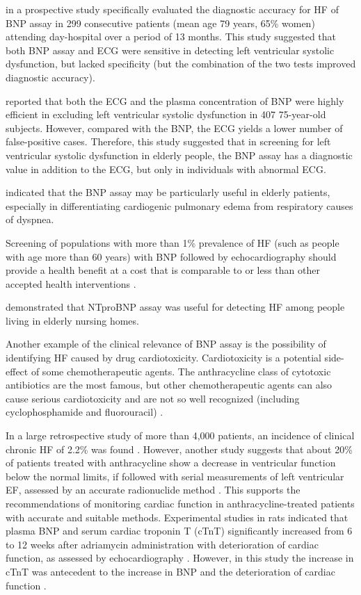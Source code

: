 \documentclass[14pt,a4paper,onecolumn]{extarticle}
\begin{document}
\citep{bib3143} in a prospective study specifically evaluated the diagnostic accuracy for HF of BNP assay in 299 consecutive patients (mean age 79 years, 65\% women) attending day-hospital over a period of 13 months. This study suggested that both BNP assay and ECG were sensitive in detecting left ventricular systolic dysfunction, but lacked specificity (but the combination of the two tests improved diagnostic accuracy).

\citep{bib3172} reported that both the ECG and the plasma concentration of BNP were highly efficient in excluding left ventricular systolic dysfunction in 407 75-year-old subjects. However, compared with the BNP, the ECG yields a lower number of false-positive cases. Therefore, this study suggested that in screening for left ventricular systolic dysfunction in elderly people, the BNP assay has a diagnostic value in addition to the ECG, but only in individuals with abnormal ECG.

\citep{bib3146} indicated that the BNP assay may be particularly useful in elderly patients, especially in differentiating cardiogenic pulmonary edema from respiratory causes of dyspnea.

Screening of populations with more than 1\% prevalence of HF (such as people with age more than 60 years) with BNP followed by echocardiography should provide a health benefit at a cost that is comparable to or less than other accepted health interventions \citep{bib3145}.

\citep{bib3147} demonstrated that NTproBNP assay was useful for detecting HF among people living in elderly nursing homes.

Another example of the clinical relevance of BNP assay is the possibility of identifying HF caused by drug cardiotoxicity. Cardiotoxicity is a potential side-effect of some chemotherapeutic agents. The anthracycline class of cytotoxic antibiotics are the most famous, but other chemotherapeutic agents can also cause serious cardiotoxicity and are not so well recognized (including cyclophosphamide and fluorouracil) \citep{bib3154}.

In a large retrospective study of more than 4,000 patients, an incidence of clinical chronic HF of 2.2\% was found \citep{bib3155}. However, another  study suggests that about 20\% of patients treated with anthracycline show a decrease in ventricular function below the normal limits, if followed with serial measurements of left ventricular EF, assessed by an accurate radionuclide method \citep{bib3156}. This supports the recommendations of monitoring cardiac function in anthracycline-treated patients with accurate and suitable methods. Experimental studies in rats indicated that plasma BNP and serum cardiac troponin T (cTnT) significantly increased from 6 to 12 weeks after adriamycin administration with deterioration of cardiac function, as assessed by echocardiography \citep{bib3157}. However, in this study the increase in cTnT was antecedent to the increase in BNP and the deterioration of cardiac function \citep{bib3157}.
\end{document}

